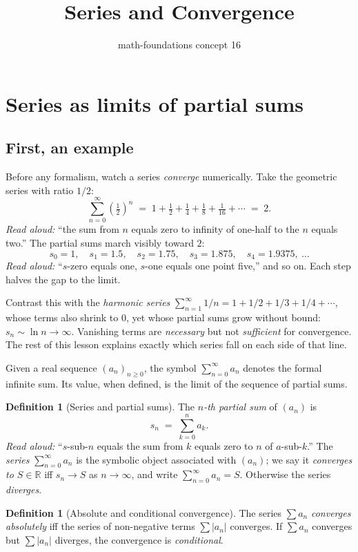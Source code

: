 \documentclass[11pt]{article}
\title{Series and Convergence}
\author{math-foundations concept 16}
\date{}
\theoremstyle{definition}
\newtheorem{definition}[theorem]{Definition}
\begin{document}
\maketitle

\section{Series as limits of partial sums}

\subsection*{First, an example}
Before any formalism, watch a series \emph{converge} numerically. Take the
geometric series with ratio $1/2$:
\[
  \sum_{n=0}^{\infty} \left(\tfrac{1}{2}\right)^n
  \;=\; 1 + \tfrac{1}{2} + \tfrac{1}{4} + \tfrac{1}{8} + \tfrac{1}{16} + \cdots
  \;=\; 2.
\]
\emph{Read aloud:} ``the sum from $n$ equals zero to infinity of one-half to
the $n$ equals two.'' The partial sums march visibly toward $2$:
\[
  s_0 = 1,\quad s_1 = 1.5,\quad s_2 = 1.75,\quad s_3 = 1.875,\quad s_4 = 1.9375,\ \ldots
\]
\emph{Read aloud:} ``$s$-zero equals one, $s$-one equals one point five,'' and
so on. Each step halves the gap to the limit.

Contrast this with the \emph{harmonic series} $\sum_{n=1}^{\infty} 1/n
= 1 + 1/2 + 1/3 + 1/4 + \cdots$, whose terms also shrink to $0$, yet whose
partial sums grow without bound: $s_n \sim \ln n \to \infty$. Vanishing terms
are \emph{necessary} but not \emph{sufficient} for convergence. The rest of
this lesson explains exactly which series fall on each side of that line.

Given a real sequence $(a_n)_{n \ge 0}$, the symbol $\sum_{n=0}^{\infty} a_n$
denotes the formal infinite sum. Its value, when defined, is the limit of the
sequence of partial sums.

\begin{definition}[Series and partial sums]
The \emph{$n$-th partial sum} of $(a_n)$ is
\[
  s_n \;=\; \sum_{k=0}^{n} a_k.
\]
\emph{Read aloud:} ``$s$-sub-$n$ equals the sum from $k$ equals zero to $n$
of $a$-sub-$k$.''
The \emph{series} $\sum_{n=0}^{\infty} a_n$ is the symbolic object associated
with $(a_n)$; we say it \emph{converges to $S \in \mathbb{R}$} iff $s_n \to S$
as $n \to \infty$, and write $\sum_{n=0}^{\infty} a_n = S$. Otherwise the
series \emph{diverges}.
\end{definition}

\begin{definition}[Absolute and conditional convergence]
The series $\sum a_n$ \emph{converges absolutely} iff the series of
non-negative terms $\sum |a_n|$ converges. If $\sum a_n$ converges but
$\sum |a_n|$ diverges, the convergence is \emph{conditional}.
\end{definition}
\end{document}
